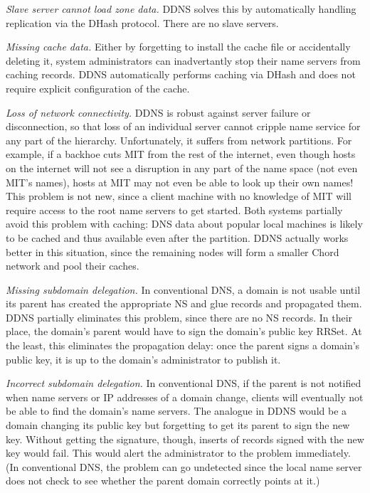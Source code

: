 {\em Slave server cannot load zone data.}
DDNS solves this by automatically handling replication 
via the DHash protocol.
There are no slave servers.

{\em Missing cache data.}
Either by forgetting to install the cache file or accidentally deleting it,
system administrators can inadvertantly stop their name servers
from caching records.
DDNS automatically performs caching via DHash and does
not require explicit configuration of the cache.

{\em Loss of network connectivity.}
DDNS is robust against server failure or disconnection, so that loss of
an individual server cannot cripple name service for any part of the
hierarchy. Unfortunately, it suffers from 
network partitions. For example, if a backhoe cuts MIT from 
the rest of the internet,
even though hosts on the internet will not see a disruption in any
part of the name space (not even MIT's names), hosts at MIT
may not even be able to look up their own names! 
This problem is not new, since a client machine with no 
knowledge of MIT will require access to the root name servers
to get started.
Both systems partially avoid this problem with caching:
DNS data about popular local machines is likely to be cached
and thus available even after the partition.
DDNS actually works better in this situation, since the remaining
nodes will form a smaller Chord network and pool their caches.
%

{\em Missing subdomain delegation.}
In conventional DNS, a domain is not usable until its parent
has created the appropriate NS and glue records and
propagated them.
DDNS partially eliminates this problem, since there are 
no NS records.
In their place, the domain's parent would have to sign the domain's
public key RRSet.
At the least, this eliminates the propagation delay: once the
parent signs a domain's public key, it is up to the domain's administrator
to publish it.

{\em Incorrect subdomain delegation.}
In conventional DNS, if the parent is not notified 
when name servers or IP addresses of a domain change,
clients will eventually not be able to find the domain's name servers.
The analogue in DDNS would be a domain changing its public
key but forgetting to get its parent to sign the new key.
Without getting the signature, though, inserts of records signed
with the new key would fail.  This would alert the administrator
to the problem immediately.  (In conventional DNS, the problem
can go undetected since the local name server does not check
to see whether the parent domain correctly points at it.)

